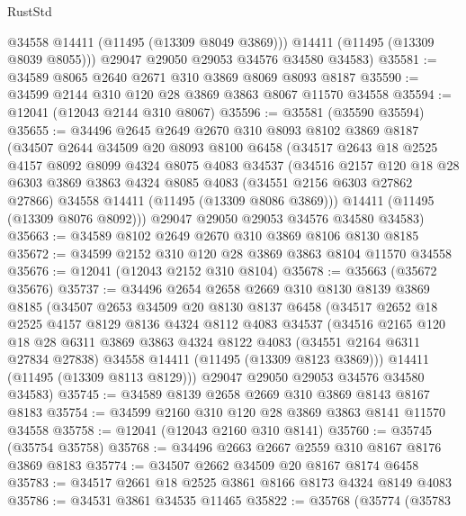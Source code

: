 \begin{lexlean}{RustStd}
\begin{coremodule}
          @34558
          @14411
          (@11495 (@13309 @8049 @3869)))
        @14411
        (@11495 (@13309 @8039 @8055)))
      @29047
      @29050
      @29053
      @34576
      @34580
      @34583)
@35581 := @34589 @8065 @2640 @2671 @310 @3869 @8069 @8093 @8187
@35590 := @34599 @2144 @310 @120 @28 @3869 @3863 @8067 @11570 @34558
@35594 := @12041 (@12043 @2144 @310 @8067)
@35596 := @35581 (@35590 @35594)
@35655 := @34496
    @2645
    @2649
    @2670
    @310
    @8093
    @8102
    @3869
    @8187
    (@34507
      @2644
      @34509
      @20
      @8093
      @8100
      @6458
      (@34517
        @2643
        @18
        @2525
        @4157
        @8092
        @8099
        @4324
        @8075
        @4083
        @34537
        (@34516
          @2157
          @120
          @18
          @28
          @6303
          @3869
          @3863
          @4324
          @8085
          @4083
          (@34551 @2156 @6303 @27862 @27866)
          @34558
          @14411
          (@11495 (@13309 @8086 @3869)))
        @14411
        (@11495 (@13309 @8076 @8092)))
      @29047
      @29050
      @29053
      @34576
      @34580
      @34583)
@35663 := @34589 @8102 @2649 @2670 @310 @3869 @8106 @8130 @8185
@35672 := @34599 @2152 @310 @120 @28 @3869 @3863 @8104 @11570 @34558
@35676 := @12041 (@12043 @2152 @310 @8104)
@35678 := @35663 (@35672 @35676)
@35737 := @34496
    @2654
    @2658
    @2669
    @310
    @8130
    @8139
    @3869
    @8185
    (@34507
      @2653
      @34509
      @20
      @8130
      @8137
      @6458
      (@34517
        @2652
        @18
        @2525
        @4157
        @8129
        @8136
        @4324
        @8112
        @4083
        @34537
        (@34516
          @2165
          @120
          @18
          @28
          @6311
          @3869
          @3863
          @4324
          @8122
          @4083
          (@34551 @2164 @6311 @27834 @27838)
          @34558
          @14411
          (@11495 (@13309 @8123 @3869)))
        @14411
        (@11495 (@13309 @8113 @8129)))
      @29047
      @29050
      @29053
      @34576
      @34580
      @34583)
@35745 := @34589 @8139 @2658 @2669 @310 @3869 @8143 @8167 @8183
@35754 := @34599 @2160 @310 @120 @28 @3869 @3863 @8141 @11570 @34558
@35758 := @12041 (@12043 @2160 @310 @8141)
@35760 := @35745 (@35754 @35758)
@35768 := @34496 @2663 @2667 @2559 @310 @8167 @8176 @3869 @8183
@35774 := @34507 @2662 @34509 @20 @8167 @8174 @6458
@35783 := @34517 @2661 @18 @2525 @3861 @8166 @8173 @4324 @8149 @4083
@35786 := @34531 @3861 @34535 @11465
@35822 := @35768
    (@35774
      (@35783

\end{coremodule}
\end{lexlean}
